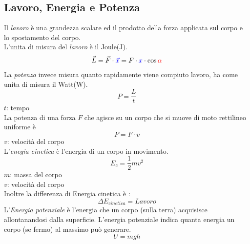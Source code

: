 \subsection{Lavoro, Energia e Potenza}\label{subsec:dinamica:potenziale}
Il \emph{lavoro} è una grandezza scalare ed il prodotto della forza applicata sul corpo e lo 
spostamento del corpo.\\L'unita di misura del \emph {lavoro} è il Joule(J).
\begin{equation*}
  \vec{L} = \vec{F} \cdot \mathcolor{blue}{\vec{x}}
  = F\cdot \textcolor{blue}{x} \cdot \cos\mathcolor{red}{\alpha}
\end{equation*}
\begin{center}
\end{center}
La \emph {potenza} invece misura quanto rapidamente viene compiuto lavoro, ha come unita di misura 
il Watt(W).
\begin{equation*}
  P = \frac{L}{t}
\end{equation*}
$t$: tempo \\ [\baselineskip]
La potenza di una forza $F$ che agisce su un corpo che si muove di moto rettilineo uniforme è
\begin{equation*}
  P=F\cdot v
\end{equation*}
$v$: velocità del corpo\\ [\baselineskip]
L'\emph{enegia cinetica} è l'energia di un corpo in movimento.\\
\begin{equation*}
  E_c = \frac{1}{2}mv^2
\end{equation*}
$m$: massa del corpo\\
$v$: velocità del corpo\\ [\baselineskip]
Inoltre la differenza di Energia cinetica è :
\begin{equation*}
  \Delta E_{cinetica}=Lavoro
\end{equation*}
L'\emph{Energia potenziale} è l'energia che un corpo (sulla terra) acquisisce allontanandosi dalla
superficie. L'energia potenziale indica quanta energia un corpo (se fermo) al massimo può generare.
\begin{equation*}
  U = mgh
\end{equation*}
